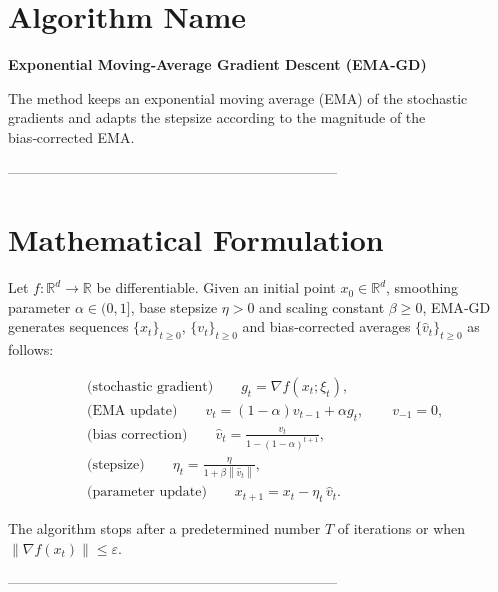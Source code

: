 \documentclass{article}
\newcommand{\norm}[1]{\left\lVert #1\right\rVert}
\newcommand{\grad}{\nabla}
\begin{document}
\section*{Algorithm Name}
\textbf{Exponential Moving‑Average Gradient Descent (EMA‑GD)}  

The method keeps an exponential moving average (EMA) of the stochastic gradients and adapts the stepsize according to the magnitude of the bias‑corrected EMA.

-----------------------------------------------------------------------

\section*{Mathematical Formulation}
Let $f:\mathbb{R}^{d}\to\mathbb{R}$ be differentiable.  
Given an initial point $x_{0}\in\mathbb{R}^{d}$, smoothing parameter $\alpha\in(0,1]$, base stepsize $\eta>0$ and scaling constant $\beta\ge 0$, EMA‑GD generates sequences $\{x_{t}\}_{t\ge 0}$, $\{v_{t}\}_{t\ge 0}$ and bias‑corrected averages $\{\hat v_{t}\}_{t\ge 0}$ as follows:

\begin{align}
    &\text{(stochastic gradient)}\qquad g_{t}= \grad f(x_{t};\xi_{t}), \label{eq:stochgrad}\\[4pt]
    &\text{(EMA update)}\qquad 
        v_{t}= (1-\alpha)v_{t-1}+ \alpha g_{t},\qquad v_{-1}=0, \label{eq:ema}\\[4pt]
    &\text{(bias correction)}\qquad 
        \hat v_{t}= \frac{v_{t}}{1-(1-\alpha)^{t+1}}, \label{eq:bias}\\[4pt]
    &\text{(stepsize)}\qquad 
        \eta_{t}= \frac{\eta}{1+\beta \norm{\hat v_{t}}}, \label{eq:stepsize}\\[4pt]
    &\text{(parameter update)}\qquad 
        x_{t+1}= x_{t}-\eta_{t}\,\hat v_{t}. \label{eq:update}
\end{align}

The algorithm stops after a predetermined number $T$ of iterations or when $\norm{\grad f(x_{t})}\le \varepsilon$.

-----------------------------------------------------------------------
\end{document}
